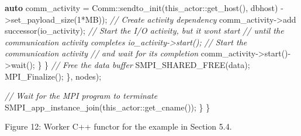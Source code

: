\documentclass[
]{article}
\newenvironment{Shaded}{}{}
\newcommand{\CommentTok}[1]{\textcolor[rgb]{0.38,0.63,0.69}{\textit{#1}}}
\newcommand{\DecValTok}[1]{\textcolor[rgb]{0.25,0.63,0.44}{#1}}
\newcommand{\KeywordTok}[1]{\textcolor[rgb]{0.00,0.44,0.13}{\textbf{#1}}}
\newcommand{\NormalTok}[1]{#1}
\newcommand{\OperatorTok}[1]{\textcolor[rgb]{0.40,0.40,0.40}{#1}}
\begin{document}
\begin{Shaded}
\begin{Highlighting}[]
    \KeywordTok{auto}\NormalTok{ comm\_activity }\OperatorTok{=}
\NormalTok{    Comm}\OperatorTok{::}\NormalTok{sendto\_init}\OperatorTok{(}\NormalTok{this\_actor}\OperatorTok{::}\NormalTok{get\_host}\OperatorTok{(),}
\NormalTok{    dbhost}\OperatorTok{)}
    \OperatorTok{{-}\textgreater{}}\NormalTok{set\_payload\_size}\OperatorTok{(}\DecValTok{1}\OperatorTok{*}\NormalTok{MB}\OperatorTok{));}
    \CommentTok{// Create activity dependency}
\NormalTok{    comm\_activity}\OperatorTok{{-}\textgreater{}}\NormalTok{add successor}\OperatorTok{(}\NormalTok{io\_activity}\OperatorTok{);}
    \CommentTok{// Start the I/O activity, but it won\textquotesingle{}t start}
    \CommentTok{// until the communication activity completes io\_activity{-}\textgreater{}start();}
    \CommentTok{// Start the communication activity}
    \CommentTok{// and wait for its completion}
\NormalTok{    comm\_activity}\OperatorTok{{-}\textgreater{}}\NormalTok{start}\OperatorTok{(){-}\textgreater{}}\NormalTok{wait}\OperatorTok{();}
    \OperatorTok{\}}
    \OperatorTok{\}}
    \CommentTok{// Free the data buffer}
\NormalTok{    SMPI\_SHARED\_FREE}\OperatorTok{(}\NormalTok{data}\OperatorTok{);}
\NormalTok{    MPI\_Finalize}\OperatorTok{();}
    \OperatorTok{\},}\NormalTok{ nodes}\OperatorTok{);}

    \CommentTok{// Wait for the MPI program to terminate}
\NormalTok{    SMPI\_app\_instance\_join}\OperatorTok{(}\NormalTok{this\_actor}\OperatorTok{::}\NormalTok{get\_cname}\OperatorTok{());}
    \OperatorTok{\}}
\OperatorTok{\}} 
\end{Highlighting}
\end{Shaded}

Figure 12: Worker C++ functor for the example in Section 5.4.
\end{document}
